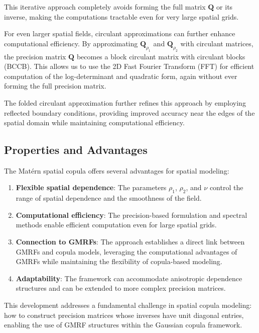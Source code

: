 This iterative approach completely avoids forming the full matrix $\mathbf{Q}$ or its inverse, making the computations tractable even for very large spatial grids.

For even larger spatial fields, circulant approximations can further enhance computational efficiency. By approximating $\mathbf{Q}_{\rho_1}$ and $\mathbf{Q}_{\rho_2}$ with circulant matrices, the precision matrix $\mathbf{Q}$ becomes a block circulant matrix with circulant blocks (BCCB). This allows us to use the 2D Fast Fourier Transform (FFT) for efficient computation of the log-determinant and quadratic form, again without ever forming the full precision matrix.

The folded circulant approximation further refines this approach by employing reflected boundary conditions, providing improved accuracy near the edges of the spatial domain while maintaining computational efficiency.

\subsection{Properties and Advantages}
The Matérn spatial copula offers several advantages for spatial modeling:

\begin{enumerate}
\item \textbf{Flexible spatial dependence}: The parameters $\rho_1$, $\rho_2$, and $\nu$ control the range of spatial dependence and the smoothness of the field.

\item \textbf{Computational efficiency}: The precision-based formulation and spectral methods enable efficient computation even for large spatial grids.

\item \textbf{Connection to GMRFs}: The approach establishes a direct link between GMRFs and copula models, leveraging the computational advantages of GMRFs while maintaining the flexibility of copula-based modeling.

\item \textbf{Adaptability}: The framework can accommodate anisotropic dependence structures and can be extended to more complex precision matrices.
\end{enumerate}

This development addresses a fundamental challenge in spatial copula modeling: how to construct precision matrices whose inverses have unit diagonal entries, enabling the use of GMRF structures within the Gaussian copula framework.

